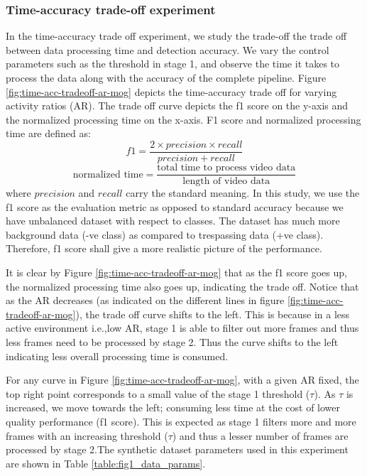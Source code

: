 \subsubsection{Time-accuracy trade-off experiment}
\label{sec:time-accuracy-trafe-off}
In the time-accuracy trade off experiment, we study the trade-off the trade off between data processing time and detection accuracy.
We vary the control parameters such as the threshold in stage 1, and observe the time it takes to process the data along with the accuracy of the complete pipeline. Figure \ref{fig:time-acc-tradeoff-ar-mog} depicts the time-accuracy trade off for varying activity ratios (AR). The trade off curve depicts the f1 score on the y-axis and the normalized processing time on the x-axis. F1 score and normalized processing time are defined as: 
$$ f1 = \frac{2 \times precision \times recall}{precision + recall}$$
$$\text{normalized time} = \frac{\text{total time to process video data}}{\text{length of video data}}$$
where $precision$ and $recall$ carry the standard meaning. In this study, we use the f1 score as the evaluation metric as opposed to standard accuracy because we have unbalanced dataset with respect to classes. The dataset has much more background data (-ve class) as compared to trespassing data (+ve class). Therefore, f1 score shall give a more realistic picture of the performance. 

It is clear by Figure \ref{fig:time-acc-tradeoff-ar-mog} that as the f1 score goes up, the normalized processing time also goes up, indicating the trade off. Notice that as the AR decreases (as indicated on the different lines in figure \ref{fig:time-acc-tradeoff-ar-mog}), the trade off curve shifts to the left. This is because in a less active environment i.e.,low AR, stage 1 is able to filter out more frames and thus less frames need to be processed by stage 2. Thus the curve shifts to the left indicating less overall processing time is consumed.   

For any curve in Figure \ref{fig:time-acc-tradeoff-ar-mog}, with a given AR fixed, the top right point corresponds to a small value of the stage 1 threshold ($\tau$). As $\tau$ is increased, we move towards the left; consuming less time at the cost of lower quality performance (f1 score). This is expected as stage 1 filters more and more frames with an increasing threshold ($\tau$) and thus a lesser number of frames are processed by stage 2.The synthetic dataset parameters used in this experiment are shown in Table \ref{table:fig1_data_params}. 

